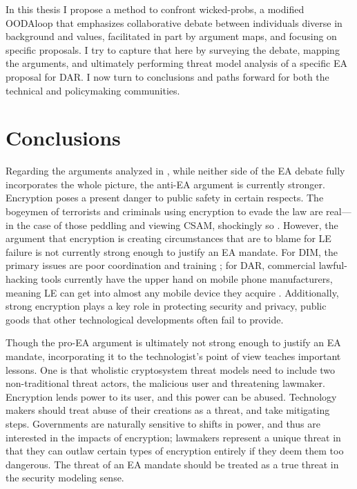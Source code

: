 In this thesis I propose a method to confront \acp{wicked-prob}, a modified \ac{OODAloop} that emphasizes collaborative
debate between individuals diverse in background and values, facilitated in part by argument maps, and focusing on
specific proposals. I try to capture that here by surveying the debate, mapping the arguments, and ultimately performing
threat model analysis of a specific \ac{EA} proposal for \acl{DAR}. I now turn to conclusions and paths forward for both
the technical and policymaking communities.


\section{Conclusions}

Regarding the arguments analyzed in , while neither side of the \ac{EA} debate fully incorporates
the whole picture, the anti-\ac{EA} argument is currently stronger. Encryption poses a present danger to public safety
in certain respects. The bogeymen of terrorists and criminals using encryption to evade the law are real---in the case
of those peddling and viewing \acl{CSAM}, shockingly so \cite{keller_internet_2019}. However, the argument that
\ac{encryption} is creating circumstances that are to blame for \acl{LE} failure is not currently strong enough to
justify an \ac{EA} mandate. For \ac{DIM}, the primary issues are poor coordination and training \cite{carter_2018}; for
\ac{DAR}, commercial \ac{lawful-hacking} tools currently have the upper hand on mobile phone manufacturers, meaning
\acl{LE} can get into almost any mobile device they acquire \cite{koepke_2020}. Additionally, strong \ac{encryption}
plays a key role in protecting security and privacy, public goods that other technological developments often fail to
provide.

Though the pro-\ac{EA} argument is ultimately not strong enough to justify an \ac{EA} mandate, incorporating it to the
technologist's point of view teaches important lessons. One is that wholistic cryptosystem threat models need to include
two non-traditional threat actors, the malicious user and threatening lawmaker. Encryption lends power to its user, and
this power can be abused. Technology makers should treat abuse of their creations as a threat, and take mitigating
steps. Governments are naturally sensitive to shifts in power, and thus are interested in the impacts of encryption;
lawmakers represent a unique threat in that they can outlaw certain types of encryption entirely if they deem them too
dangerous. The threat of an \ac{EA} mandate should be treated as a true threat in the security modeling sense.

